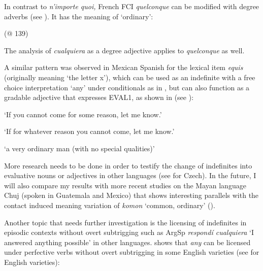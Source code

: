 In contrast to \textit{n’importe quoi,} French FCI \textit{quelconque} can be modified with degree adverbs (see \citealt{Vlachou2007}). It has the meaning of ‘ordinary’:


{(@ 139)}
\z

The analysis of \textit{cualquiera} as a degree adjective applies to \textit{quelconque} as well.

A similar pattern was observed in Mexican Spanish for the lexical item \textit{equis} (originally meaning ‘the letter x’), which can be used as an indefinite with a free choice interpretation ‘any’ under conditionals as in , but can also function as a gradable adjective that expresses EVAL1, as shown in  (see \citealt{Kellert2020semantic}):

    \glt ‘If you cannot come for some reason, let me know.’

    \glt ‘If for whatever reason you cannot come, let me know.’

    \citep[137]{Kellert2020semantic}
\z 

    \glt ‘a very ordinary man (with no special qualities)’

    \citep[138]{Kellert2020semantic}
\z

More research needs to be done in order to testify the change of indefinites into evaluative nouns or adjectives in other languages (see \citealt{Simik2008} for Czech). In the future, I will also compare my results with more recent studies on the Mayan language Chuj (spoken in Guatemala and Mexico) that shows interesting parallels with the contact induced meaning variation of \textit{komon} ‘common, ordinary’ (\citealt{Alonso-OvalleRoyer2021}).

Another topic that needs further investigation is the licensing of indefinites in episodic contexts without overt subtrigging such as ArgSp \textit{respondí cualquiera} ‘I answered anything possible’ in other languages. \citet{Dayal1998} shows that \textit{any} can be licensed under perfective verbs without overt subtrigging in some English varieties (see \citealt{Dayal1998} for English varieties):

